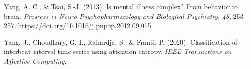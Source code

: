 \documentclass[
  man]{apa6}
\newlength{\cslhangindent}
\newlength{\cslentryspacingunit} %
\newenvironment{CSLReferences}[2] %
 {%
  \setlength{\parindent}{0pt}
  \ifodd #1
  \let\oldpar\par
  \def\par{\hangindent=\cslhangindent\oldpar}
  \fi
  \setlength{\parskip}{#2\cslentryspacingunit}
 }%
 {}
\begin{document}
\begin{CSLReferences}{1}{0}
\leavevmode{}%
Yang, A. C., \& Tsai, S.-J. (2013). Is mental illness complex? From behavior to brain. \emph{Progress in Neuro-Psychopharmacology and Biological Psychiatry}, \emph{45}, 253--257. \url{https://doi.org/10.1016/j.pnpbp.2012.09.015}

\leavevmode{}%
Yang, J., Choudhary, G. I., Rahardja, S., \& Franti, P. (2020). Classification of interbeat interval time-series using attention entropy. \emph{IEEE Transactions on Affective Computing}.

\end{CSLReferences}


\clearpage
\renewcommand{\listfigurename}{Figure captions}
\end{document}
